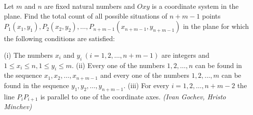 Let $m$ and $n$ are fixed natural numbers and $Oxy$ is a coordinate system in the plane. Find the total count of all possible situations of $n+m-1$ points $P_1(x_1,y_1),P_2(x_2,y_2),\ldots,P_{n+m-1}(x_{n+m-1},y_{n+m-1})$ in the plane for which the following conditions are satisfied:

(i) The numbers $x_i$ and $y_i~(i=1,2,\ldots,n+m-1)$ are integers and $1\le x_i\le n,1\le y_i\le m$.
(ii) Every one of the numbers $1,2,\ldots,n$ can be found in the sequence $x_1,x_2,\ldots,x_{n+m-1}$ and every one of the numbers $1,2,\ldots,m$ can be found in the sequence $y_1,y_2,\ldots,y_{n+m-1}$.
(iii) For every $i=1,2,\ldots,n+m-2$ the line $P_iP_{i+1}$ is parallel to one of the coordinate axes. \textit{(Ivan Gochev, Hristo Minchev)}